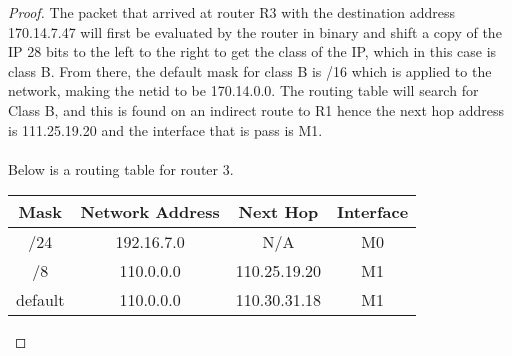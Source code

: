 \documentclass[12pt]{article}
\begin{document}
\begin{proof}
The packet that arrived at router R3 with the destination address 170.14.7.47 will first be evaluated by the router in binary and shift a copy of the IP 28 bits to the left to the right to get the class of the IP, which in this case is class B. From there, the default mask for class B is /16 which is applied to the network, making the netid to be 170.14.0.0. The routing table will search for Class B, and this is found on an indirect route to R1 hence the next hop address is 111.25.19.20 and the interface that is pass is M1. \\ \\ 
Below is a routing table for router 3. \\
\begin{center}
\begin{tabular}{ |c|c|c|c| } 
 \hline
 Mask & Network Address & Next Hop & Interface \\ 
 \hline 
 /24 & 192.16.7.0 & N/A & M0\\
 \hline 
 /8 & 110.0.0.0 & 110.25.19.20 & M1\\
 \hline 
 default & 110.0.0.0 & 110.30.31.18 & M1 \\
 \hline
\end{tabular}
\end{center}
\end{proof}
\end{document}
